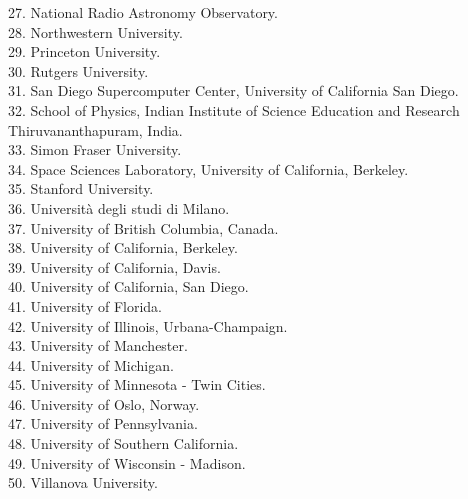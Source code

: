 \documentclass[PICOReport.tex]{subfiles}
\begin{document}
\begin{multicols}{2}
{27. National Radio Astronomy Observatory.  \\
28. Northwestern University.  \\
29. Princeton University.  \\
30. Rutgers University.  \\
31. San Diego Supercomputer Center, University of California San Diego.  \\
32. School of Physics, Indian Institute of Science Education and Research Thiruvananthapuram,  India.  \\
33. Simon Fraser University.  \\
34. Space Sciences Laboratory, University of California, Berkeley.  \\
35. Stanford University.  \\
36. Universit\`a degli studi di Milano.  \\
37. University of British Columbia, Canada.  \\
38. University of California, Berkeley.  \\
39. University of California, Davis.  \\
40. University of California, San Diego.  \\
41. University of Florida.  \\
42. University of Illinois, Urbana-Champaign.  \\
43. University of Manchester.  \\
44. University of Michigan.  \\
45. University of Minnesota - Twin Cities.  \\
46. University of Oslo, Norway.  \\
47. University of Pennsylvania.  \\
48. University of Southern California.  \\
49. University of Wisconsin - Madison.  \\
50. Villanova University.  
}
\end{multicols}
\end{document}
